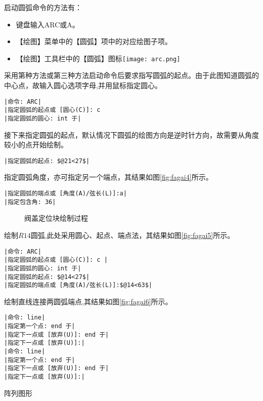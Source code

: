 \begin{procedure}
启动圆弧命令的方法有：
\begin{itemize}
\item 键盘输入ARC或A。
\item 【绘图】菜单中的【圆弧】项中的对应绘图子项。
\item 【绘图】工具栏中的【圆弧】图标\texttt{[image: arc.png]}
\end{itemize}
采用第种方法或第三种方法启动命令后要求指写圆弧的起点。由于此图知道圆弧的中心点，故输入圆心选项字母,并用鼠标指定圆心。
\begin{lstlisting}
|命令: ARC|
|指定圆弧的起点或 [圆心(C)]: c 
|指定圆弧的圆心: int 于|
\end{lstlisting}
接下来指定圆弧的起点，默认情况下圆弧的绘图方向是逆时针方向，故需要从角度较小的点开始绘制。
\begin{lstlisting}
|指定圆弧的起点: $@21<27$|
\end{lstlisting}
指定圆弧角度，亦可指定另一个端点，其结果如图\ref{fig:fagai4}所示。
\begin{lstlisting}
|指定圆弧的端点或 [角度(A)/弦长(L)]:a|
|指定包含角: 36|
\end{lstlisting}
\begin{figure}[htbp]
\centering
{}\hspace{30pt}
\hspace{30pt}
\caption{阀盖定位块绘制过程}
\end{figure}
绘制$R14$圆弧,此处采用圆心、起点、端点法，其结果如图\ref{fig:fagai5}所示。
\begin{lstlisting}
|命令: ARC|
|指定圆弧的起点或 [圆心(C)]: c |
|指定圆弧的圆心: int 于|
|指定圆弧的起点: $@14<27$|
|指定圆弧的端点或 [角度(A)/弦长(L)]:$@14<63$|
\end{lstlisting}
绘制直线连接两圆弧端点,其结果如图\ref{fig:fagai6}所示。
\begin{lstlisting}
|命令: line|
|指定第一个点: end 于|
|指定下一点或 [放弃(U)]: end 于|
|指定下一点或 [放弃(U)]:|
|命令: line|
|指定第一个点: end 于|
|指定下一点或 [放弃(U)]: end 于|
|指定下一点或 [放弃(U)]:|
\end{lstlisting}
\item 阵列图形


\end{procedure}
